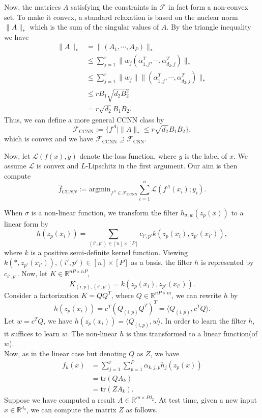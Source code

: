 \documentclass{article}
\begin{document}
Now, the matrices $A$ satisfying the constraints in $\mathcal{F}$ in fact form a non-convex 	set. To make it convex, a standard relaxation is based on the nuclear norm $\|A\|_*$ which is the sum of the singular values of $A$. By the triangle inequality we have
\begin{align*}
\|A\|_*&=\|(A_1,\cdots,A_P)\|_*\\
&\leq\sum_{j=1}^r\|w_j(\alpha_{1,j}^T,\cdots,\alpha_{d_2,j}^T)\|_*\\
&\leq\sum_{j=1}^r\|w_j\|\|(\alpha_{1,j}^T,\cdots,\alpha_{d_2,j}^T)\|_*\\
&\leq rB_1\sqrt{d_2B_2^2}\\
&=r\sqrt{d_2}B_1B_2.
\end{align*}
Thus, we can define a more general CCNN class by
\[\mathcal{F}_{\text{CCNN}}:=\lbrace f^A|\|A\|_*\leq r\sqrt{d_2}B_1B_2\rbrace,\]
which is convex and we have $\mathcal{F}_{\text{CCNN}}\supseteq\mathcal{F}_{\text{CNN}}$.

Now, let $\mathcal{L}(f(x),y)$ denote the loss function, where $y$ is the label of $x$. We assume $\mathcal{L}$ is convex and $L$-Lipschitz in the first argument. Our aim is then compute
\[\widehat{f}_{CCNN}:=\text{argmin}_{f^A\in\mathcal{F}_{\text{CCNN}}}\sum_{i=1}^n\mathcal{L}(f^A(x_i);y_i).\]

When $\sigma$ is a non-linear function, we transform the filter $h_{\sigma,w}(z_p(x))$ to a linear form by
\[h(z_p(x_i))=\sum_{(i',p')\in[n]\times[P]}c_{i',p'}k(z_p(x_i),z_{p'}(x_{i'})),\]
where $k$ is a positive semi-definite kernel function. Viewing $k(*,z_{p'}(x_{i'})),(i',p')\in[n]\times[P]$ as a basis, the filter $h$ is represented by $c_{i',p'}$. Now, let $K\in\mathbb{R}^{nP\times nP}$,
\[K_{(i,p),(i',p')}=k(z_p(x_i),z_{p'}(x_{i'})).\]
Consider a factorization $K=QQ^T$, where $Q\in\mathbb{R}^{nP\times m}$, we can rewrite $h$ by 
\[h(z_p(x_i))=c^T(Q_{(i,p)}Q^T)^T=\langle Q_{(i,p)},c^TQ\rangle.\]
Let $w=c^TQ$, we have $h(z_p(x_i))=\langle Q_{(i,p)},w\rangle$. In order to learn the filter $h$, it suffices to learn $w$. The non-linear $h$ is thus transformed to a linear function(of $w$).\\
Now, as in the linear case but denoting $Q$ as $Z$, we have
\begin{align*}
f_k(x)&=\sum_{j=1}^{r}\sum_{p=1}^{P}\alpha_{k,j,p}h_j(z_p(x))\\
&=\text{tr}(QA_k)\\
&=\text{tr}(ZA_k).
\end{align*}
Suppose we have computed a result $A\in\mathbb{R}^{m\times Pd_2}$. At test time, given a new input $x\in\mathbb{R}^{d_0}$, we can compute the matrix $Z$ as follows.
\end{document}
